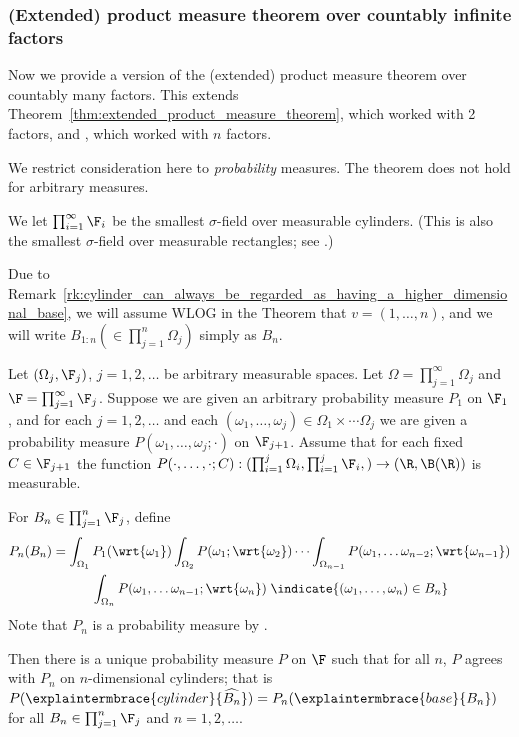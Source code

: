 \documentclass{article} %
\newcommand{\cylinder}[1]{\widehat{#1}}
\begin{document}
\subsubsection{(Extended) product measure theorem over countably infinite factors}

Now we provide a version of the (extended) product measure theorem over countably many factors.  This extends Theorem~\ref{thm:extended_product_measure_theorem}, which worked with 2 factors, and \cite[Thm 2.6.7]{ash2000probability}, which worked with $n$ factors. 

We restrict consideration here to \textit{probability} measures.  The theorem does not hold for arbitrary measures. 

We let $\prod_{i=1}^\infty \F_i$ be the smallest $\sigma$-field over measurable cylinders.  (This is also the smallest $\sigma$-field over measurable rectangles; see \cite[Sec 2.7, Problem 1]{ash2000probability}.) 

Due to Remark~\ref{rk:cylinder_can_always_be_regarded_as_having_a_higher_dimensional_base}, we will assume WLOG in the Theorem that $v=(1,\hdots,n)$, and we will write $B_{1:n} (\in \prod_{j=1}^n \Omega_j)$ simply as $B_n$.  

\begin{theorem}
Let $(\Omega_j, \F_j)$, $j=1,2,\hdots$ be arbitrary measurable spaces.  Let $\Omega = \prod_{j=1}^\infty \Omega_j$ and   $\F = \prod_{j=1}^\infty \F_j$.  Suppose we are given an arbitrary probability measure $P_1$ on $\F_1$, and for each $j=1,2,\hdots$ and each $(\omega_1, \hdots, \omega_j) \in \Omega_1 \times \cdots \Omega_j$ we are given a probability measure $P(\omega_1, \hdots, \omega_j; \cdot)$ on $\F_{j+1}$.  Assume that for each fixed $C \in \F_{j+1}$ the function $P(\cdot, \hdots, \cdot; C) : (\prod_{i=1}^j \Omega_i, \prod_{i=1}^j \F_i, ) \to (\R, \B(\R))$ is measurable.  

For $B_n \in \prod_{j=1}^n \F_j$, define  
\begin{align}
P_n(B_n) &= \int_{\Omega_1} P_1(\wrt{\omega_1}) \int_{\Omega_2} P(\omega_1; \wrt{\omega_2}) \cdots \int_{\Omega_{n-1}} P(\omega_1, \hdots \omega_{n-2}; \wrt{\omega_{n-1}})  
\nonumber 
 \\
& \quad \quad \quad \int_{\Omega_{n}} P(\omega_1, \hdots \omega_{n-1}; \wrt{\omega_{n}}) \;\indicate{(\omega_1,\hdots, \omega_n) \in B_n}  
\label{eqn:product_measure_in_n_coordinates}
\end{align}	
Note that $P_n$ is a probability measure by \cite[Thm.~2.6.7]{ash2000probability}.

Then there is a unique probability measure $P$ on $\F$ such that for all $n$, $P$ agrees with $P_n$ on $n$-dimensional cylinders; that is $P(\explaintermbrace{cylinder}{\cylinder{B_n}}) = P_n(\explaintermbrace{base}{B_n})$ for all $B_n \in \prod_{j=1}^n \F_j$ and $n=1,2,\hdots$. 
\label{thm:extended_product_measure_theorem_over_countably_infinite_spaces}
\end{theorem}
\end{document}
